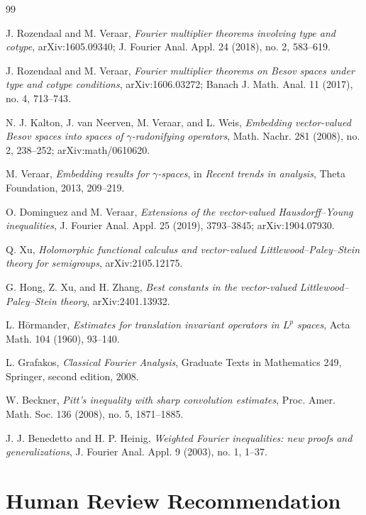 \documentclass[11pt]{article}
\begin{document}
\begin{thebibliography}{99}

J. Rozendaal and M. Veraar, \emph{Fourier multiplier theorems involving type and cotype}, arXiv:1605.09340; J. Fourier Anal. Appl. 24 (2018), no. 2, 583--619.

J. Rozendaal and M. Veraar, \emph{Fourier multiplier theorems on Besov spaces under type and cotype conditions}, arXiv:1606.03272; Banach J. Math. Anal. 11 (2017), no. 4, 713--743.

N. J. Kalton, J. van Neerven, M. Veraar, and L. Weis, \emph{Embedding vector-valued Besov spaces into spaces of \(\gamma\)-radonifying operators}, Math. Nachr. 281 (2008), no. 2, 238--252; arXiv:math/0610620.

M. Veraar, \emph{Embedding results for \(\gamma\)-spaces}, in \emph{Recent trends in analysis}, Theta Foundation, 2013, 209--219.

O. Dominguez and M. Veraar, \emph{Extensions of the vector-valued Hausdorff--Young inequalities}, J. Fourier Anal. Appl. 25 (2019), 3793--3845; arXiv:1904.07930.

Q. Xu, \emph{Holomorphic functional calculus and vector-valued Littlewood--Paley--Stein theory for semigroups}, arXiv:2105.12175.

G. Hong, Z. Xu, and H. Zhang, \emph{Best constants in the vector-valued Littlewood--Paley--Stein theory}, arXiv:2401.13932.

L. H\"ormander, \emph{Estimates for translation invariant operators in \(L^p\) spaces}, Acta Math. 104 (1960), 93--140.

L. Grafakos, \emph{Classical Fourier Analysis}, Graduate Texts in Mathematics 249, Springer, second edition, 2008.

W. Beckner, \emph{Pitt's inequality with sharp convolution estimates}, Proc. Amer. Math. Soc. 136 (2008), no. 5, 1871--1885.

J. J. Benedetto and H. P. Heinig, \emph{Weighted Fourier inequalities: new proofs and generalizations}, J. Fourier Anal. Appl. 9 (2003), no. 1, 1--37.

\end{thebibliography}

\section*{Human Review Recommendation}
\end{document}
